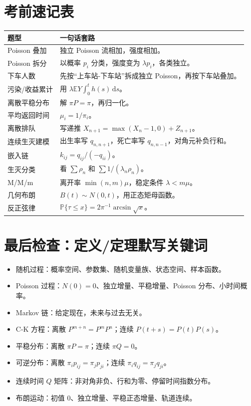\documentclass[12pt,a4paper,openany]{ctexrep}
\theoremstyle{definition}
\newcommand{\E}{\mathbb{E}}
\newcommand{\Pp}{\mathbb{P}}
\newcommand{\dd}{\,\mathrm{d}}
\begin{document}
\section{考前速记表}

\begin{center}
\begin{tabular}{p{4.2cm}p{9.2cm}}
\toprule
题型 & 一句话套路 \\
\midrule
Poisson 叠加 & 独立 Poisson 流相加，强度相加。\\
Poisson 拆分 & 以概率 $p_i$ 分类，强度变为 $\lambda p_i$，各类独立。\\
下车人数 & 先按“上车站-下车站”拆成独立 Poisson，再按下车站叠加。\\
污染/收益累计 & 用 $\lambda\E Y\int_0^t h(s)\dd s$。\\
离散平稳分布 & 解 $\pi P=\pi$，再归一化。\\
平均返回时间 & $\mu_i=1/\pi_i$。\\
离散排队 & 写递推 $X_{n+1}=\max(X_n-1,0)+Z_{n+1}$。\\
连续生灭建模 & 出生率写 $q_{n,n+1}$，死亡率写 $q_{n,n-1}$，对角元补负行和。\\
嵌入链 & $k_{ij}=q_{ij}/(-q_{ii})$。\\
生灭分类 & 看 $\sum\rho_n$ 和 $\sum1/(\lambda_n\rho_n)$。\\
M/M/m & 离开率 $\min(n,m)\mu$，稳定条件 $\lambda<m\mu$。\\
几何布朗 & $B(t)\sim N(0,t)$，用正态矩母函数。\\
反正弦律 & $\Pp\{\tau\le x\}=2\pi^{-1}\arcsin\sqrt{x}$。\\
\bottomrule
\end{tabular}
\end{center}

\section{最后检查：定义/定理默写关键词}

\begin{itemize}
	\item 随机过程：概率空间、参数集、随机变量族、状态空间、样本函数。
	\item Poisson 过程：$N(0)=0$、独立增量、平稳增量、Poisson 分布、小时间概率。
	\item Markov 链：给定现在，未来与过去无关。
	\item C-K 方程：离散 $P^{m+n}=P^mP^n$；连续 $P(t+s)=P(t)P(s)$。
	\item 平稳分布：离散 $\pi P=\pi$；连续 $\pi Q=0$。
	\item 可逆分布：离散 $\pi_ip_{ij}=\pi_jp_{ji}$；连续 $\pi_iq_{ij}=\pi_jq_{ji}$。
	\item 连续时间 $Q$ 矩阵：非对角非负、行和为零、停留时间指数分布。
	\item 布朗运动：初值 $0$、独立增量、平稳正态增量、轨道连续。
\end{itemize}
\end{document}
